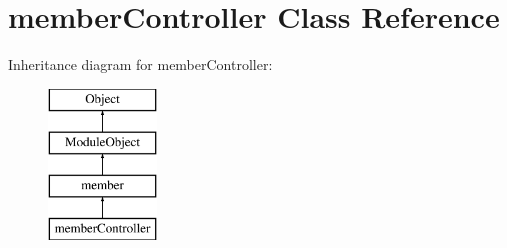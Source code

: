 \hypertarget{classmemberController}{\section{member\+Controller Class Reference}
\label{classmemberController}
}
Inheritance diagram for member\+Controller\+:\begin{figure}[H]
\begin{center}
\leavevmode
\includegraphics[height=4.000000cm]{classmemberController}
\end{center}
\end{figure}
